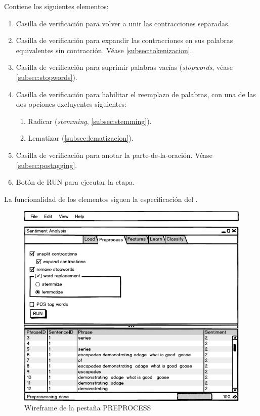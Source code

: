 Contiene los siguientes elementos:
\begin{enumerate}
\item Casilla de verificación para volver a unir las contracciones separadas.
\item Casilla de verificación para expandir las contracciones en sus palabras equivalentes sin contracción. Véase \autoref{subsec:tokenizacion}.
\item Casilla de verificación para suprimir palabras vacías (\emph{stopwords}, véase \autoref{subsec:stopwords}).
\item Casilla de verificación para habilitar el reemplazo de palabras, con una de las dos opciones excluyentes siguientes:
\begin{enumerate}
\item Radicar (\emph{stemming}, \autoref{subsec:stemming}).
\item Lematizar (\autoref{subsec:lematizacion}).
\end{enumerate}
\item Casilla de verificación para anotar la parte-de-la-oración. Véase \autoref{subsec:postagging}.
\item Botón de RUN para ejecutar la etapa.
\end{enumerate}

La funcionalidad de los elementos siguen la especificación del .

\begin{figure}[htbp]
\centering
\includegraphics[width=12cm,clip=true,trim=0 0 0 38pt]{gui-2-preprocess}
\caption{Wireframe de la pestaña PREPROCESS}
\label{fig:gui-2-preprocess}
\end{figure}


